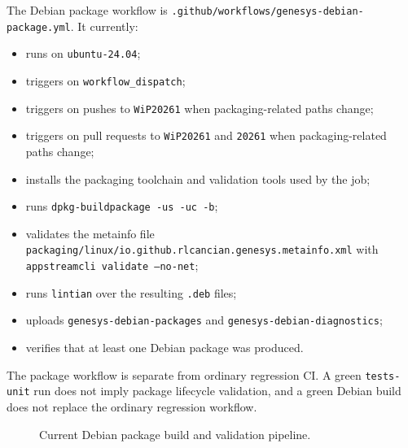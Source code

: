The Debian package workflow is \texttt{.github/workflows/genesys-debian-package.yml}.
It currently:
\begin{itemize}
\item runs on \texttt{ubuntu-24.04};
\item triggers on \texttt{workflow\_dispatch};
\item triggers on pushes to \texttt{WiP20261} when packaging-related paths change;
\item triggers on pull requests to \texttt{WiP20261} and \texttt{20261} when
  packaging-related paths change;
\item installs the packaging toolchain and validation tools used by the job;
\item runs \texttt{dpkg-buildpackage -us -uc -b};
\item validates the metainfo file
  \texttt{packaging/linux/io.github.rlcancian.genesys.metainfo.xml} with
  \texttt{appstreamcli validate --no-net};
\item runs \texttt{lintian} over the resulting \texttt{.deb} files;
\item uploads \texttt{genesys-debian-packages} and
  \texttt{genesys-debian-diagnostics};
\item verifies that at least one Debian package was produced.
\end{itemize}

The package workflow is separate from ordinary regression CI. A green
\texttt{tests-unit} run does not imply package lifecycle validation, and a green
Debian build does not replace the ordinary regression workflow.

\begin{figure}[htbp]
\centering
\caption{Current Debian package build and validation pipeline.}
\label{fig:packaging-debian-pipeline}
\end{figure}

